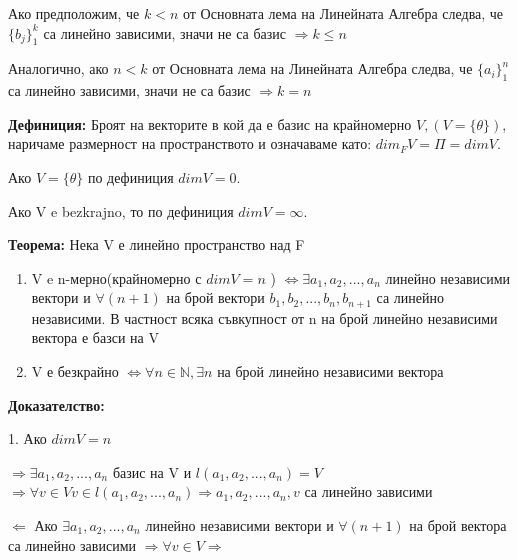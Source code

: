 \documentclass[fleqn,12pt]{article}
\begin{document}
\begin{flushleft}
        Ако предположим, че $k < n $ от Основната лема на Линейната Алгебра следва, че $ \{b_j\}_1^k $ са линейно зависими, значи не са базис $\Rightarrow k \leq n $

        Аналогично, ако $n < k $ от Основната лема на Линейната Алгебра следва, че $ \{a_i\}_1^n $ са линейно зависими, значи не са базис $\Rightarrow k = n $


    
    \vspace{5mm}
    
    \textbf{Дефиниция:} Броят на векторите в кой да е базис на крайномерно $V, (V = \{\theta\}) $, наричаме размерност на пространството и означаваме като: $dim_F V = \Pi = dimV$.

    Ако $V = \{\theta\} $ по дефиниция $ dimV = 0$. 

    Ако V e bezkrajno, то по дефиниция $ dimV = \infty$. 

    \vspace{5mm}
    
    \textbf{Теорема:} Нека V е линейно пространство над F
    
    \begin{enumerate}
        \item V e n-мерно(крайномерно с $dimV = n$ ) $\Leftrightarrow \exists a_1, a_2, ..., a_n $ линейно независими вектори и $ \forall (n+1)$ на брой вектори $b_1, b_2, ..., b_n, b_{n+1}$ са линейно независими. В частност всяка съвкупност от n на брой линейно независими вектора е базси на V
        \item V е безкрайно $ \Leftrightarrow  \forall n \in \mathbb{N}, \exists n $ на брой линейно независими вектора
    \end{enumerate}

    \vspace{5mm}
    
        \textbf{Доказателство:}

        1. Ако $dimV = n $
            
        \vspace{5mm}
        
        $\Rightarrow \exists a_1, a_2, ..., a_n $ базис на V и $l(a_1, a_2, ..., a_n) = V$ $\Rightarrow \forall v \in V v \in l(a_1, a_2, ..., a_n) \Rightarrow a_1, a_2, ..., a_n, v $ са линейно зависими 

        \vspace{5mm}
    
        $\Leftarrow $ Ако $ \exists a_1, a_2, ..., a_n $ линейно независими вектори и $ \forall (n + 1) $ на брой вектора са линейно зависими $\Rightarrow \forall v \in V \Rightarrow $ 
            

\end{flushleft}
\end{document}
